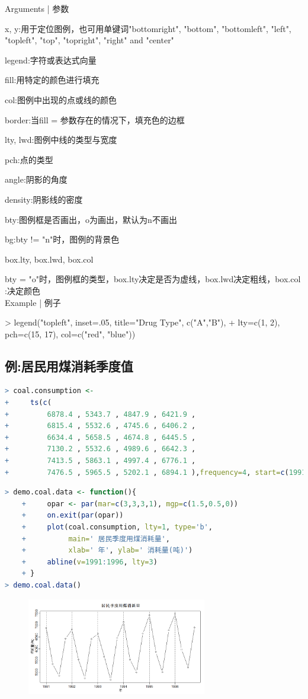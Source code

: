 \documentclass[11pt,a4paper,oneside]{book}
\begin{document}
Arguments | 参数

x, y:用于定位图例，也可用单键词"bottomright", "bottom", "bottomleft", "left", "topleft", "top", "topright", "right" and "center"

legend:字符或表达式向量

fill:用特定的颜色进行填充

col:图例中出现的点或线的颜色

border:当fill = 参数存在的情况下，填充色的边框

lty, lwd:图例中线的类型与宽度

pch:点的类型

angle:阴影的角度

density:阴影线的密度

bty:图例框是否画出，o为画出，默认为n不画出

bg:bty != "n"时，图例的背景色

box.lty, box.lwd, box.col

bty = "o"时，图例框的类型，box.lty决定是否为虚线，box.lwd决定粗线，box.col :决定颜色\\


Example | 例子

> legend("topleft", inset=.05, title="Drug Type", c("A","B"),
+        lty=c(1, 2), pch=c(15, 17), col=c("red", "blue"))

\subsection{例:居民用煤消耗季度值}
\begin{lstlisting}[language=r]
> coal.consumption <-
+     ts(c(
+         6878.4 , 5343.7 , 4847.9 , 6421.9 ,
+         6815.4 , 5532.6 , 4745.6 , 6406.2 ,
+         6634.4 , 5658.5 , 4674.8 , 6445.5 ,
+         7130.2 , 5532.6 , 4989.6 , 6642.3 ,
+         7413.5 , 5863.1 , 4997.4 , 6776.1 ,
+         7476.5 , 5965.5 , 5202.1 , 6894.1 ),frequency=4, start=c(1991,1))
\end{lstlisting}

\begin{lstlisting}[language=r]
> demo.coal.data <- function(){
	+     opar <- par(mar=c(3,3,3,1), mgp=c(1.5,0.5,0))
	+     on.exit(par(opar))
	+     plot(coal.consumption, lty=1, type='b',
	+          main=' 居民季度用煤消耗量',
	+          xlab=' 年', ylab=' 消耗量(吨)')
	+     abline(v=1991:1996, lty=3)
	+ }
> demo.coal.data()
\end{lstlisting}
\begin{figure}[H]
	\centering
	\includegraphics[width=0.7\textwidth]{2.png}
\end{figure}
\end{document}

